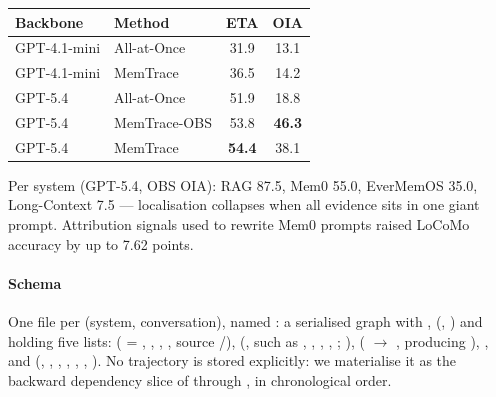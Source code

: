 \begin{center}\small
\begin{tabular}{@{}llcc@{}}\toprule
Backbone & Method & ETA & OIA\\\midrule
GPT-4.1-mini & All-at-Once & 31.9 & 13.1\\
GPT-4.1-mini & MemTrace & 36.5 & 14.2\\
GPT-5.4 & All-at-Once & 51.9 & 18.8\\
GPT-5.4 & MemTrace-OBS & 53.8 & \textbf{46.3}\\
GPT-5.4 & MemTrace & \textbf{54.4} & 38.1\\\bottomrule
\end{tabular}
\end{center}
Per system (GPT-5.4, OBS OIA): RAG 87.5, Mem0 55.0, EverMemOS 35.0, Long-Context 7.5 --- localisation collapses when all evidence sits in one giant prompt. Attribution signals used to rewrite Mem0 prompts raised LoCoMo accuracy by up to 7.62 points.

\paragraph{Schema} One file per (system, conversation), named  : a serialised  graph with ,  (, ) and  holding five lists:  ( = , , , , source /),  (,  such as , , , , ; ),  ( $\to$ , producing ), , and  (, , , , , , ). No trajectory is stored explicitly: we materialise it as the backward dependency slice of  through , in chronological order.

